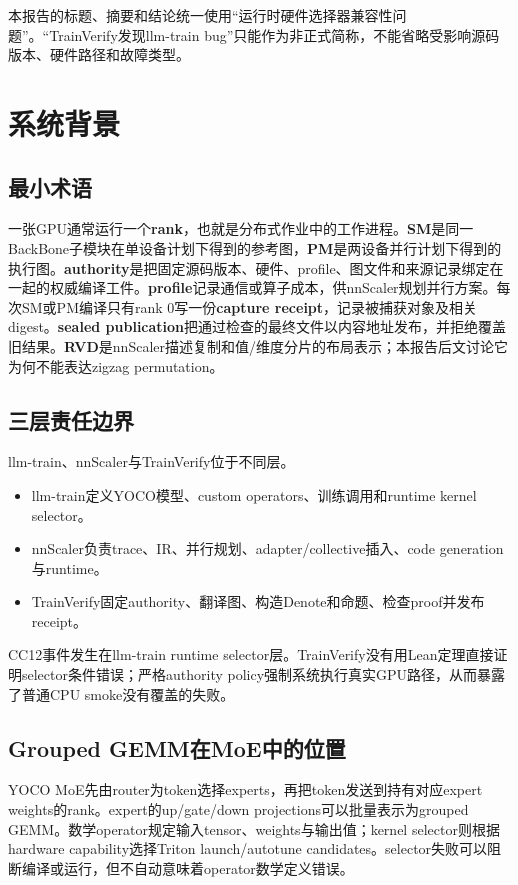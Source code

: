 \documentclass[10.5pt,a4paper]{ctexart}
\begin{document}
本报告的标题、摘要和结论统一使用“运行时硬件选择器兼容性问题”。“TrainVerify发现llm-train bug”只能作为非正式简称，不能省略受影响源码版本、硬件路径和故障类型。

\section{系统背景}

\subsection{最小术语}

一张GPU通常运行一个\textbf{rank}，也就是分布式作业中的工作进程。\textbf{SM}是同一BackBone子模块在单设备计划下得到的参考图，\textbf{PM}是两设备并行计划下得到的执行图。\textbf{authority}是把固定源码版本、硬件、profile、图文件和来源记录绑定在一起的权威编译工件。\textbf{profile}记录通信或算子成本，供nnScaler规划并行方案。每次SM或PM编译只有rank 0写一份\textbf{capture receipt}，记录被捕获对象及相关digest。\textbf{sealed publication}把通过检查的最终文件以内容地址发布，并拒绝覆盖旧结果。\textbf{RVD}是nnScaler描述复制和值/维度分片的布局表示；本报告后文讨论它为何不能表达zigzag permutation。

\subsection{三层责任边界}

llm-train、nnScaler与TrainVerify位于不同层。
\begin{itemize}
  \item llm-train定义YOCO模型、custom operators、训练调用和runtime kernel selector。
  \item nnScaler负责trace、IR、并行规划、adapter/collective插入、code generation与runtime。
  \item TrainVerify固定authority、翻译图、构造Denote和命题、检查proof并发布receipt。
\end{itemize}

CC12事件发生在llm-train runtime selector层。TrainVerify没有用Lean定理直接证明selector条件错误；严格authority policy强制系统执行真实GPU路径，从而暴露了普通CPU smoke没有覆盖的失败。

\subsection{Grouped GEMM在MoE中的位置}

YOCO MoE先由router为token选择experts，再把token发送到持有对应expert weights的rank。expert的up/gate/down projections可以批量表示为grouped GEMM。数学operator规定输入tensor、weights与输出值；kernel selector则根据hardware capability选择Triton launch/autotune candidates。selector失败可以阻断编译或运行，但不自动意味着operator数学定义错误。
\end{document}
